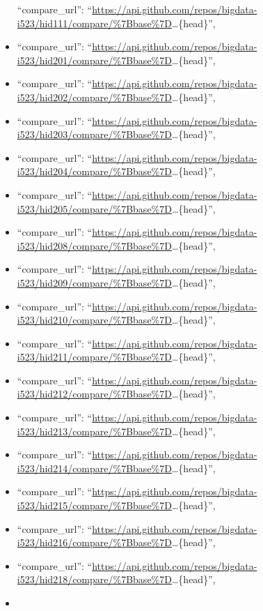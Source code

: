 \begin{itemize}
  ``compare\_url'':
  ``\url{https://api.github.com/repos/bigdata-i523/hid111/compare/\%7Bbase\%7D}\ldots{}\{head\}'',
\item
  ``compare\_url'':
  ``\url{https://api.github.com/repos/bigdata-i523/hid201/compare/\%7Bbase\%7D}\ldots{}\{head\}'',
\item
  ``compare\_url'':
  ``\url{https://api.github.com/repos/bigdata-i523/hid202/compare/\%7Bbase\%7D}\ldots{}\{head\}'',
\item
  ``compare\_url'':
  ``\url{https://api.github.com/repos/bigdata-i523/hid203/compare/\%7Bbase\%7D}\ldots{}\{head\}'',
\item
  ``compare\_url'':
  ``\url{https://api.github.com/repos/bigdata-i523/hid204/compare/\%7Bbase\%7D}\ldots{}\{head\}'',
\item
  ``compare\_url'':
  ``\url{https://api.github.com/repos/bigdata-i523/hid205/compare/\%7Bbase\%7D}\ldots{}\{head\}'',
\item
  ``compare\_url'':
  ``\url{https://api.github.com/repos/bigdata-i523/hid208/compare/\%7Bbase\%7D}\ldots{}\{head\}'',
\item
  ``compare\_url'':
  ``\url{https://api.github.com/repos/bigdata-i523/hid209/compare/\%7Bbase\%7D}\ldots{}\{head\}'',
\item
  ``compare\_url'':
  ``\url{https://api.github.com/repos/bigdata-i523/hid210/compare/\%7Bbase\%7D}\ldots{}\{head\}'',
\item
  ``compare\_url'':
  ``\url{https://api.github.com/repos/bigdata-i523/hid211/compare/\%7Bbase\%7D}\ldots{}\{head\}'',
\item
  ``compare\_url'':
  ``\url{https://api.github.com/repos/bigdata-i523/hid212/compare/\%7Bbase\%7D}\ldots{}\{head\}'',
\item
  ``compare\_url'':
  ``\url{https://api.github.com/repos/bigdata-i523/hid213/compare/\%7Bbase\%7D}\ldots{}\{head\}'',
\item
  ``compare\_url'':
  ``\url{https://api.github.com/repos/bigdata-i523/hid214/compare/\%7Bbase\%7D}\ldots{}\{head\}'',
\item
  ``compare\_url'':
  ``\url{https://api.github.com/repos/bigdata-i523/hid215/compare/\%7Bbase\%7D}\ldots{}\{head\}'',
\item
  ``compare\_url'':
  ``\url{https://api.github.com/repos/bigdata-i523/hid216/compare/\%7Bbase\%7D}\ldots{}\{head\}'',
\item
  ``compare\_url'':
  ``\url{https://api.github.com/repos/bigdata-i523/hid218/compare/\%7Bbase\%7D}\ldots{}\{head\}'',
\item

\end{itemize}

